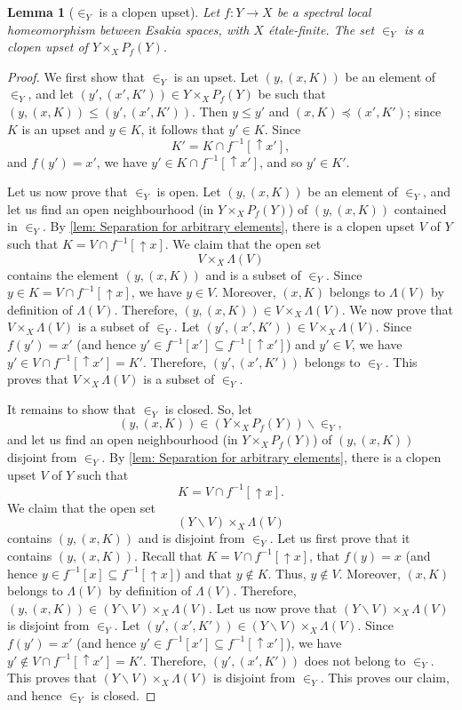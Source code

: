 \documentclass[12pt]{amsart}
\theoremstyle{plain}
\newtheorem{lemma}[theorem]{Lemma}
\theoremstyle{definition}
\renewcommand{\u}{{\uparrow}}
\begin{document}
\begin{lemma}[$\in_{Y}$ is a clopen upset]
    Let $f \colon Y \to X$ be a spectral local homeomorphism between Esakia spaces, with $X$ étale-finite.
    The set $\in_{Y}$ is a clopen upset of $Y\times_{X}P_{f}(Y)$.
\end{lemma}
\begin{proof}
    We first show that $\in_Y$ is an upset. 
    Let $(y,(x,K))$ be an element of ${\in_Y}$, and let $(y',(x',K')) \in Y\times_{X}P_{f}(Y)$ be such that $(y,(x,K)) \leq (y',(x',K'))$. Then $y\leq y'$ and $(x,K)\preceq (x',K')$; since $K$ is an upset and $y\in K$, it follows that $y'\in K$.
    Since
    \[
        K'=K\cap f^{-1}[{\u}x'],
    \]
    and $f(y')=x'$, we have $y'\in K\cap f^{-1}[{\u}x']$, and so $y'\in K'$.

    Let us now prove that $\in_Y$ is open.
    Let $(y,(x,K))$ be an element of ${\in_Y}$, and let us find an open neighbourhood (in $Y\times_{X}P_{f}(Y)$) of $(y,(x,K))$ contained in $\in_Y$.
    By \cref{lem: Separation for arbitrary elements}, there is a clopen upset $V$ of $Y$ such that $K=V\cap f^{-1}[{\u}x]$.
    We claim that the open set
    \[
        V\times_X \Lambda(V)
    \]
    contains the element $(y,(x,K))$ and is a subset of $\in_Y$.
    Since $y \in K = V \cap f^{-1}[{\u}x]$, we have $y \in V$.
    Moreover, $(x,K)$ belongs to $\Lambda(V)$ by definition of $\Lambda(V)$.
    Therefore, $(y,(x,K)) \in V\times_X \Lambda(V)$.
    We now prove that $V\times_X \Lambda(V)$ is a subset of $\in_{Y}$.
    Let $(y', (x', K')) \in V \times_X \Lambda(V)$.
    Since $f(y') = x'$ (and hence $y' \in f^{-1}[x'] \subseteq f^{-1}[{\u}x']$) and $y' \in V$, we have $y' \in V \cap f^{-1}[{\u}x'] = K'$. Therefore, $(y', (x', K'))$ belongs to $\in_Y$. This proves that $V \times_X \Lambda(V)$ is a subset of $\in_{Y}$.

    It remains to show that $\in_Y$ is closed.
    So, let 
    \[
    (y,(x,K)) \in (Y\times_{X}P_{f}(Y)) \smallsetminus {\in_Y},
    \]
    and let us find an open neighbourhood (in $Y\times_{X}P_{f}(Y)$) of $(y,(x,K))$ disjoint from $\in_Y$.
    By \cref{lem: Separation for arbitrary elements}, there is a clopen upset $V$ of $Y$ such that
    \[
    K=V\cap f^{-1}[{\u}x].
    \]
    We claim that the open set
    \[
        (Y \smallsetminus V)\times_X \Lambda(V)
    \]
    contains $(y,(x,K))$ and is disjoint from $\in_Y$.
    Let us first prove that it contains $(y, (x, K))$. Recall that $K = V \cap f^{-1}[{\u}x]$, that $f(y)=x$ (and hence $y \in f^{-1}[x] \subseteq f^{-1}[{\u}x]$) and that $y \notin K$.
    Thus, $y \notin V$.
    Moreover, $(x,K)$ belongs to $\Lambda(V)$ by definition of $\Lambda(V)$.
    Therefore, $(y,(x,K)) \in (Y \smallsetminus V)\times_X \Lambda(V)$.
    Let us now prove that $(Y \smallsetminus V)\times_X \Lambda(V)$ is disjoint from $\in_{Y}$.
    Let $(y', (x', K')) \in (Y \smallsetminus V)\times_X \Lambda(V)$.
    Since $f(y') = x'$ (and hence $y' \in f^{-1}[x'] \subseteq f^{-1}[{\u}x']$), we have $y' \notin V \cap f^{-1}[{\u}x'] = K'$. Therefore, $(y', (x', K'))$ does not belong to $\in_Y$. This proves that $(Y \smallsetminus V)\times_X \Lambda(V)$ is disjoint from $\in_{Y}$. This proves our claim, and hence $\in_Y$ is closed.
    

\end{proof}
\end{document}
